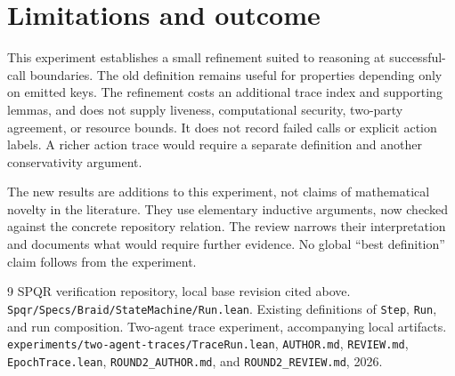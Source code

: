 \documentclass[11pt]{article}
\begin{document}
\section{Limitations and outcome}
This experiment establishes a small refinement suited to reasoning at successful-call
boundaries. The old definition remains useful for properties depending only on emitted
keys. The refinement costs an additional trace index and supporting lemmas, and does not
supply liveness, computational security, two-party agreement, or resource bounds. It does
not record failed calls or explicit action labels. A richer action trace would require a
separate definition and another conservativity argument.

The new results are additions to this experiment, not claims of mathematical novelty in the
literature. They use elementary inductive arguments, now checked against the concrete
repository relation. The review narrows their interpretation and documents what would
require further evidence. No global ``best definition'' claim follows from the experiment.

\begingroup
\small
\raggedright
\begin{thebibliography}{9}
 SPQR verification repository, local base revision cited above.
\texttt{Spqr/Specs/Braid/StateMachine/Run.lean}.
Existing definitions of \texttt{Step}, \texttt{Run}, and run composition.
 Two-agent trace experiment, accompanying local artifacts.
\texttt{experiments/two-agent-traces/TraceRun.lean},
\texttt{AUTHOR.md}, \texttt{REVIEW.md}, \texttt{EpochTrace.lean},
\texttt{ROUND2\_AUTHOR.md}, and \texttt{ROUND2\_REVIEW.md}, 2026.
\end{thebibliography}
\endgroup
\end{document}
